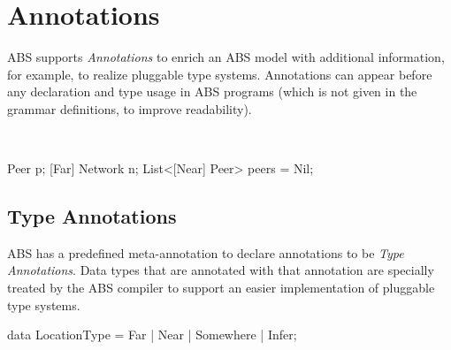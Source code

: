\chapter{Annotations}
ABS supports \emph{Annotations} to enrich an ABS model with additional information, for example, to realize pluggable type systems.
Annotations can appear before any declaration and type usage in ABS programs (which is not given in the grammar definitions, to improve readability).

\begin{abssyntax}
  \TRS{[}\ \ \ \TRS{]}
\end{abssyntax}

\begin{absexample}
 Peer p;
[Far] Network n;
List<[Near] Peer> peers = Nil;
\end{absexample}

\section{Type Annotations}
ABS has a predefined meta-annotation  to declare
annotations to be \emph{Type Annotations}.
Data types that are annotated with that annotation are specially treated by the
ABS compiler to support an easier implementation of pluggable type systems.

\begin{absexample}
[TypeAnnotation]
data LocationType = Far | Near | Somewhere | Infer;
\end{absexample}
